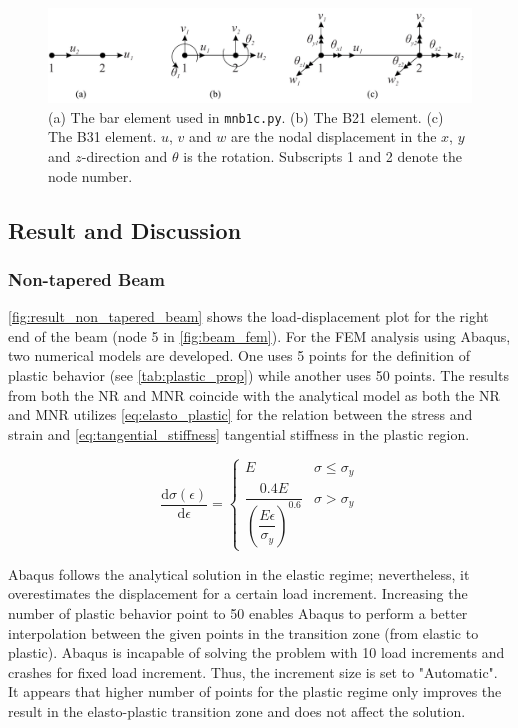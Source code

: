 \documentclass{article}
\begin{document}
\begin{figure}[H]
    \centering
    \includegraphics[width = 1\textwidth ]{figures/all_elements.pdf}
    \caption{(a) The bar element used in \texttt{mnb1c.py}. (b) The B21 element. (c) The B31 element. $u$, $v$ and $w$ are the nodal displacement in the $x$, $y$ and $z$-direction and $\theta$ is the rotation. Subscripts 1 and 2 denote the node number.}
    \label{fig:element}
\end{figure}

\subsection{Result and Discussion}
\subsubsection{Non-tapered Beam}
\cref{fig:result_non_tapered_beam} shows the load-displacement plot for the right end of the beam (node 5 in \cref{fig:beam_fem}). For the FEM analysis using Abaqus, two numerical models are developed. One uses 5 points for the definition of plastic behavior (see \cref{tab:plastic_prop}) while another uses 50 points. The results from both the NR and MNR coincide with the analytical model as both the NR and MNR utilizes \cref{eq:elasto_plastic} for the relation between the stress and strain and \cref{eq:tangential_stiffness} tangential stiffness in the plastic region. 

\begin{equation}
    \dfrac{\text{d}\sigma(\epsilon)}{\text{d}\epsilon} = 
    \begin{cases}
     E & \sigma \le \sigma_y\\ 
    \dfrac{0.4 E}{\left( \dfrac{E \epsilon}{\sigma_y} \right)^{0.6}} & \sigma > \sigma_y
    \end{cases}
    \label{eq:tangential_stiffness}
\end{equation}

Abaqus follows the analytical solution in the elastic regime; nevertheless, it overestimates the displacement for a certain load increment. Increasing the number of plastic behavior point to 50 enables Abaqus to perform a better interpolation between the given points in the transition zone (from elastic to plastic). Abaqus is incapable of solving the problem with 10 load increments and crashes for fixed load increment. Thus, the increment size is set to "Automatic". It appears that higher number of points for the plastic regime only improves the result in the elasto-plastic transition zone and does not affect the solution.
\end{document}

